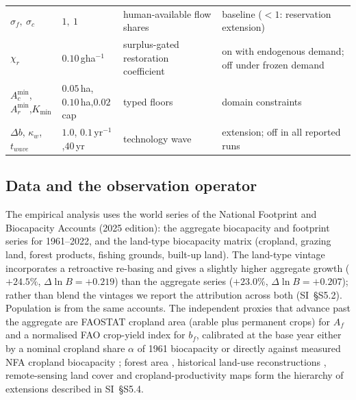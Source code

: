 \documentclass[preprint,12pt,authoryear]{elsarticle}
\newcommand{\Acmin}{A_c^{\min}}
\begin{document}
\begin{table}[!htbp]
\begin{tabularx}{\textwidth}{@{}>{\raggedright\arraybackslash}p{} >{\raggedright\arraybackslash}p{} >{\raggedright\arraybackslash}X >{\raggedright\arraybackslash}p{}@{}}
$\sigma_f,\ \sigma_c$ & $1,\ 1$ & human-available flow shares & baseline ($<1$: reservation extension) \\
$\chi_r$ & $0.10$\,gha$^{-1}$ & surplus-gated restoration coefficient & on with endogenous demand; off under frozen demand \\
$\Acmin$, $A_r^{\min}$,\newline $K_{\min}$ & $0.05$\,ha, $0.10$\,ha,\newline $0.02$\,cap & typed floors & domain constraints \\
$\Delta b$, $\kappa_w$,\newline $t_{wave}$ & $1.0$, $0.1$\,yr$^{-1}$,\newline $40$\,yr & technology wave & extension; off in all reported runs \\
\bottomrule
\end{tabularx}
\end{table}

\subsection{Data and the observation operator}\label{sec:data}

The empirical analysis uses the world series of the National Footprint and Biocapacity Accounts (2025 edition): the aggregate biocapacity and footprint series for 1961--2022, and the land-type biocapacity matrix (cropland, grazing land, forest products, fishing grounds, built-up land). The land-type vintage incorporates a retroactive re-basing and gives a slightly higher aggregate growth ($+24.5\%$, $\Delta\ln B=+0.219$) than the aggregate series ($+23.0\%$, $\Delta\ln B=+0.207$); rather than blend the vintages we report the attribution across both (SI~\S S5.2). Population is from the same accounts. The independent proxies that advance past the aggregate are FAOSTAT cropland area (arable plus permanent crops) for $A_f$ and a normalised FAO crop-yield index for $b_f$, calibrated at the base year either by a nominal cropland share $\alpha$ of 1961 biocapacity or directly against measured NFA cropland biocapacity \citep{FAO2023}; forest area \citep{FAO2020}, historical land-use reconstructions \citep{Hurtt2011,KleinGoldewijk2017}, remote-sensing land cover \citep{ESA2017,Copernicus2019} and cropland-productivity maps \citep{Monfreda2008} form the hierarchy of extensions described in SI~\S S5.4.
\end{document}
